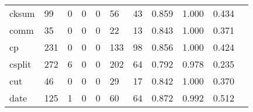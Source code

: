 \begin{longtable}{lp{1.20cm}p{1.20cm}p{1.20cm}p{1.20cm}p{1.20cm}p{1.20cm}p{1.20cm}p{1.20cm}p{1.20cm}p{1.20cm}}
cksum     &                                    99 &                                                  0 &                                                  0 &                                                  0 &                                                 56 &                                                 43 &                                         0.859 &                                              1.000 &                                              0.434 \\
comm      &                                    35 &                                                  0 &                                                  0 &                                                  0 &                                                 22 &                                                 13 &                                         0.843 &                                              1.000 &                                              0.371 \\
cp        &                                   231 &                                                  0 &                                                  0 &                                                  0 &                                                133 &                                                 98 &                                         0.856 &                                              1.000 &                                              0.424 \\
csplit    &                                   272 &                                                  6 &                                                  0 &                                                  0 &                                                202 &                                                 64 &                                         0.792 &                                              0.978 &                                              0.235 \\
cut       &                                    46 &                                                  0 &                                                  0 &                                                  0 &                                                 29 &                                                 17 &                                         0.842 &                                              1.000 &                                              0.370 \\
date      &                                   125 &                                                  1 &                                                  0 &                                                  0 &                                                 60 &                                                 64 &                                         0.872 &                                              0.992 &                                              0.512 \\

\end{longtable}
